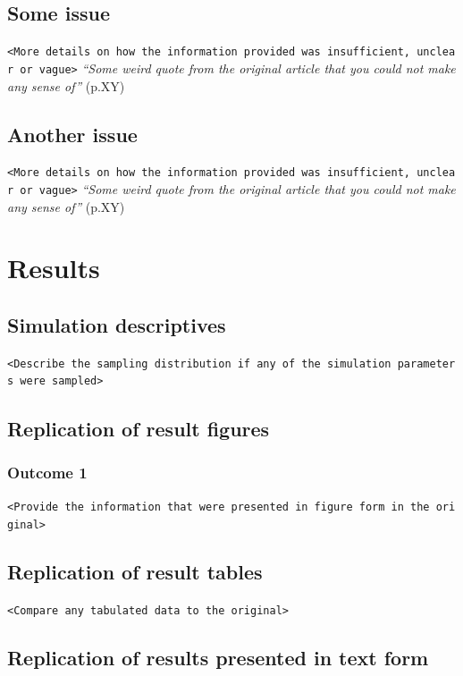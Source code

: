 \documentclass[10,a4paperpaper,]{article}
\begin{document}
\subsection{Some issue}

\texttt{\textless{}More\ details\ on\ how\ the\ information\ provided\ was\ insufficient,\ unclear\ or\ vague\textgreater{}}
\emph{``Some weird quote from the original article that you could not
make any sense of''} (p.XY)

\subsection{Another issue}

\texttt{\textless{}More\ details\ on\ how\ the\ information\ provided\ was\ insufficient,\ unclear\ or\ vague\textgreater{}}
\emph{``Some weird quote from the original article that you could not
make any sense of''} (p.XY)

\section{Results}

\subsection{Simulation descriptives}

\texttt{\textless{}Describe\ the\ sampling\ distribution\ if\ any\ of\ the\ simulation\ parameters\ were\ sampled\textgreater{}}

\subsection{Replication of result figures}
\subsubsection{Outcome 1}

\texttt{\textless{}Provide\ the\ information\ that\ were\ presented\ in\ figure\ form\ in\ the\ original\textgreater{}}

\subsection{Replication of result tables}

\texttt{\textless{}Compare\ any\ tabulated\ data\ to\ the\ original\textgreater{}}

\subsection{Replication of results presented in text form }
\end{document}
